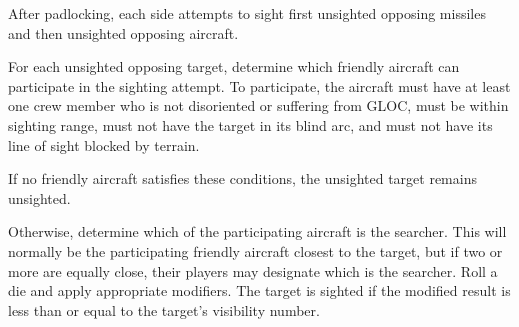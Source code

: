 {After padlocking, each side attempts to sight first unsighted opposing missiles and then unsighted opposing aircraft.

For each unsighted opposing target, determine which friendly aircraft can participate in the sighting attempt. To participate, the aircraft must have at least one crew member who is not disoriented or suffering from GLOC, must be within sighting range, must not have the target in its blind arc, and must not have its line of sight blocked by terrain. 

If no friendly aircraft satisfies these conditions, the unsighted target remains unsighted.

Otherwise, determine which of the participating aircraft is the searcher. This will normally be the participating friendly aircraft closest to the target, but if two or more are equally close, their players may designate which is the searcher. Roll a die and apply appropriate modifiers. The target is sighted if the modified result is less than or equal to the target's visibility number.


}

